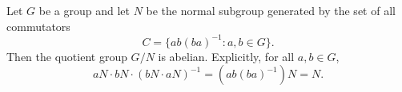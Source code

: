 Let $G$ be a group and let $N$ be the normal subgroup generated by the set of all commutators
$$
C = \{ab(ba)^{-1} : a, b \in G\}.
$$
Then the quotient group $G/N$ is abelian. Explicitly, for all $a, b \in G$,
$$
aN \cdot bN \cdot (bN \cdot aN)^{-1} = (ab(ba)^{-1})N = N.
$$
